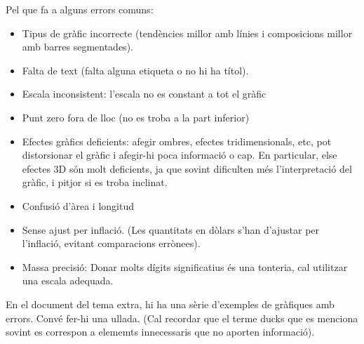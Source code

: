 \documentclass[12pt]{article}
\begin{document}
    \hfill \break
    Pel que fa a alguns errors comuns:
    \begin{itemize}
        \item Tipus de gràfic incorrecte (tendències millor amb línies i composicions millor amb barres segmentades).
        \item Falta de text (falta alguna etiqueta o no hi ha títol).
        \item Escala inconsistent: l'escala no es constant a tot el gràfic
        \item Punt zero fora de lloc (no es troba a la part inferior)
        \item Efectes gràfics deficients: afegir ombres, efectes tridimensionals, etc, pot distorsionar el gràfic i afegir-hi poca informació o cap. En particular,
        else efectes 3D són molt deficients, ja que sovint dificulten més l'interpretació del gràfic, i pitjor si es troba inclinat.
        \item Confusió d'àrea i longitud
        \item Sense ajust per inflació. (Les quantitats en dòlars s'han d'ajustar per l'inflació, evitant comparacions errònees).
        \item Massa precisió: Donar molts dígits significatius és una tonteria, cal utilitzar una escala adequada.
    \end{itemize}

    En el document del tema extra, hi ha una sèrie d'exemples de gràfiques amb errors. Convé fer-hi una ullada. (Cal recordar que el terme ducks que es menciona sovint es correspon a elememts innecessaris
    que no aporten informació).
\end{document}
